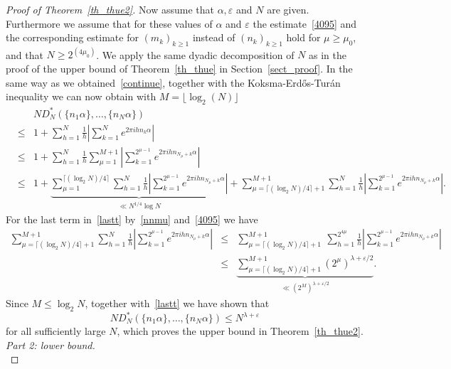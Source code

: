 \documentclass[12pt]{amsart}
\newcommand {\ve} {\varepsilon}
\begin{document}
\begin{proof}[Proof of Theorem~\ref{th_thue2}]
Now assume that $\alpha, \ve$ and $N$ are given. Furthermore we assume that for these values of $\alpha$ and $\ve$ the estimate~\eqref{4095} and the corresponding estimate for $(m_k)_{k \geq 1}$ instead of $(n_k)_{k \geq 1}$ hold for $\mu \geq \mu_0$, and that $N \geq 2^{(4\mu_0)}$. We apply the same dyadic decomposition of $N$ as in the proof of the upper bound of Theorem~\ref{th_thue} in Section~\ref{sect_proof}. In the same way as we obtained~\eqref{continue}, together with the Koksma-Erd\H{o}s-Tur\'an inequality we can now obtain with $M=\lfloor \log_2(N)\rfloor$
\begin{eqnarray}
& & N D_N^* (\{n_1 \alpha\}, \dots, \{n_N \alpha\}) \nonumber\\
& \leq & 1 + \sum_{h=1}^N \frac{1}{h} \left|\sum_{k=1}^N e^{2 \pi i h n_k \alpha}\right| \nonumber\\
& \leq & 1 + \sum_{h=1}^N \frac{1}{h} \sum_{\mu=1}^{M+1}  \left|\sum_{k= 1}^{2^{\mu-1}} e^{2 \pi i h n_{N_\mu+k} \alpha}\right| \nonumber\\
& \leq & 1 + \underbrace{ \sum_{\mu=1}^{\lceil (\log_2 N)/4\rceil} \sum_{h=1}^N \frac{1}{h} \left|\sum_{k= 1}^{2^{\mu-1}} e^{2 \pi i h n_{N_\mu+k} \alpha}\right|}_{\ll N^{1/4} \log N}  + \sum_{\mu=\lceil (\log_2 N)/4\rceil+1}^{M+1} \sum_{h=1}^N \frac{1}{h}  \left|\sum_{k= 1}^{2^{\mu-1}} e^{2 \pi i h n_{N_\mu+k} \alpha}\right|. \label{lastt}
\end{eqnarray}
For the last term in~\eqref{lastt} by~\eqref{nnmu} and~\eqref{4095} we have
\begin{eqnarray*}
\sum_{\mu=\lceil (\log_2 N)/4\rceil+1}^{M+1} \sum_{h=1}^N \frac{1}{h}  \left|\sum_{k= 1}^{2^{\mu-1}} e^{2 \pi i h n_{N_\mu+k} \alpha}\right| & \leq & \sum_{\mu=\lceil (\log_2 N)/4\rceil+1}^{M+1} ~\sum_{h=1}^{2^{4\mu}} \frac{1}{h}  \left|\sum_{k= 1}^{2^{\mu-1}} e^{2 \pi i h n_{N_\mu+k} \alpha}\right| \\
& \leq & \underbrace{\sum_{\mu=\lceil (\log_2 N)/4\rceil+1}^{M+1} (2^\mu)^{\lambda+\ve/2}}_{\ll (2^M)^{\lambda+\ve/2}}.
\end{eqnarray*}
Since $M \leq \log_2 N$, together with~\eqref{lastt} we have shown that 
$$
N D_N^* (\{n_1 \alpha\}, \dots, \{n_N \alpha\}) \leq N^{\lambda+\ve} 
$$
for all sufficiently large $N$, which proves the upper bound in Theorem~\ref{th_thue2}.\\

\emph{Part 2: lower bound.}\\


\end{proof}
\end{document}
